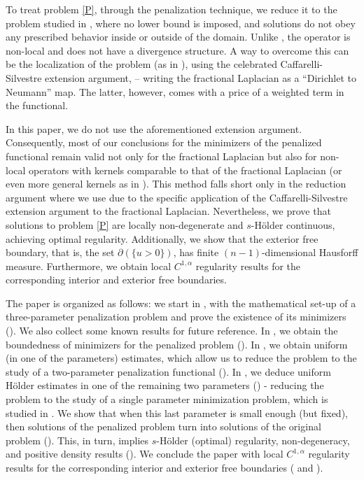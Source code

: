 \documentclass[11pt, reqno]{amsart}
\numberwithin{equation}{section}
\numberwithin{theorem}{section}
\numberwithin{lemma}{section}
\numberwithin{corollary}{section}
\numberwithin{remark}{section}
\numberwithin{proposition}{section}
\numberwithin{definition}{section}
\begin{document}
To treat problem \eqref{P}, through the penalization technique, we reduce it to the problem studied in \cite{TT15}, where no lower bound is imposed, and solutions do not obey any prescribed behavior inside or outside of the domain. Unlike \cite{TU17,Y16}, the operator is non-local and does not have a divergence structure. A way to overcome this can be the localization of the problem (as in \cite{TT15}), using the celebrated Caffarelli-Silvestre extension argument, \cite{CS07} -- writing the fractional Laplacian as a ``Dirichlet to Neumann'' map. The latter, however, comes with a price of a weighted term in the functional.

In this paper, we do not use the aforementioned extension argument. Consequently, most of our conclusions for the minimizers of the penalized functional remain valid not only for the fractional Laplacian but also for non-local operators with kernels comparable to that of the fractional Laplacian \cite{CS09} (or even more general kernels as in \cite{CTU20}). This method falls short only in the reduction argument where we use \cite{TT15} due to the specific application of the Caffarelli-Silvestre extension argument to the fractional Laplacian. Nevertheless, we prove that solutions to problem \eqref{P} are locally non-degenerate and $s$-H\"older continuous, achieving optimal regularity. Additionally, we show that the exterior free boundary, that is, the set $\partial\left(\{u>0\}\right)$, has finite $(n-1)$-dimensional Hausforff measure. Furthermore, we obtain local $C^{1,\alpha}$ regularity results for the corresponding interior and exterior free boundaries.

\smallskip

The paper is organized as follows: we start in  , with the mathematical set-up of a three-parameter penalization problem and prove the existence of its minimizers (). We also collect some known results for future reference. In , we obtain the boundedness of minimizers for the penalized problem (). In , we obtain uniform (in one of the parameters) estimates, which allow us to reduce the problem to the study of a two-parameter penalization functional (). In , we deduce uniform H\"older estimates in one of the remaining two parameters () - reducing the problem to the study of a single parameter minimization problem, which is studied in . We show that when this last parameter is small enough (but fixed), then solutions of the penalized problem turn into solutions of the original problem (). This, in turn, implies $s$-H\"older (optimal) regularity, non-degeneracy, and positive density results (). We conclude the paper with local $C^{1,\alpha}$ regularity results for the corresponding interior and exterior free boundaries ( and ).
\end{document}

